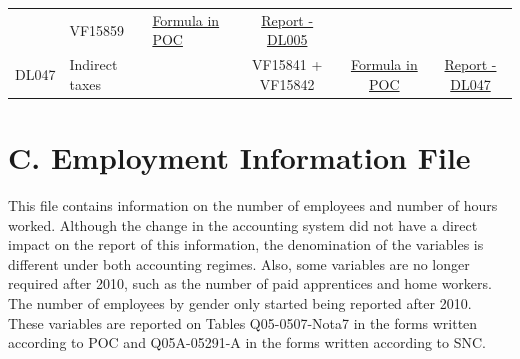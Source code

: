 \documentclass[]{book}
\begin{document}
\begin{longtable}[]{@{}cllccc@{}}
\begin{minipage}[t]{0.16\columnwidth}
\strut
\end{minipage} & \begin{minipage}[t]{0.09\columnwidth}\centering
VF15859\strut
\end{minipage} & \begin{minipage}[t]{0.15\columnwidth}\centering
\protect\hyperlink{dl005---formula-in-poc}{Formula in POC}\strut
\end{minipage} & \begin{minipage}[t]{0.16\columnwidth}\centering
\href{./Auxiliary\%20Files/technical_reports/variable_report/DL005(!).pdf}{Report - DL005}\strut
\end{minipage}\tabularnewline
\begin{minipage}[t]{0.08\columnwidth}\centering
DL047\strut
\end{minipage} & \begin{minipage}[t]{0.20\columnwidth}\raggedright
Indirect taxes\strut
\end{minipage} & \begin{minipage}[t]{0.16\columnwidth}\raggedright
\strut
\end{minipage} & \begin{minipage}[t]{0.09\columnwidth}\centering
VF15841 + VF15842\strut
\end{minipage} & \begin{minipage}[t]{0.15\columnwidth}\centering
\protect\hyperlink{dl047---formula-in-poc}{Formula in POC}\strut
\end{minipage} & \begin{minipage}[t]{0.16\columnwidth}\centering
\href{./Auxiliary\%20Files/technical_reports/variable_report/DL047(!).pdf}{Report - DL047}\strut
\end{minipage}\tabularnewline
\bottomrule
\end{longtable}

\hypertarget{c.-employment-information-file}{%
\section{C. Employment Information File}\label{c.-employment-information-file}}

This file contains information on the number of employees and number of hours worked. Although the change in the accounting system did not have a direct impact on the report of this information, the denomination of the variables is different under both accounting regimes. Also, some variables are no longer required after 2010, such as the number of paid apprentices and home workers. The number of employees by gender only started being reported after 2010.
These variables are reported on Tables Q05-0507-Nota7 in the forms written according to POC and Q05A-05291-A in the forms written according to SNC.
\end{document}
